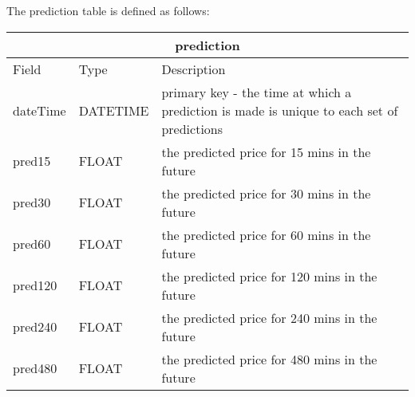             The prediction table is defined as follows:

            \begin{tabular}{|p{2cm}|p{2cm}|p{7cm}|}
                \hline
                \multicolumn{3}{|c|}{prediction} \\
                \hline
                Field & Type & Description \\
                \hline
                dateTime & DATETIME & primary key - the time at which a prediction is made is unique to each set of predictions\\
                pred15 & FLOAT & the predicted price for 15 mins in the future \\
                pred30 & FLOAT & the predicted price for 30 mins in the future \\
                pred60 & FLOAT & the predicted price for 60 mins in the future \\
                pred120 & FLOAT & the predicted price for 120 mins in the future \\
                pred240 & FLOAT & the predicted price for 240 mins in the future \\
                pred480 & FLOAT & the predicted price for 480 mins in the future \\
                \hline
            \end{tabular}
            
            